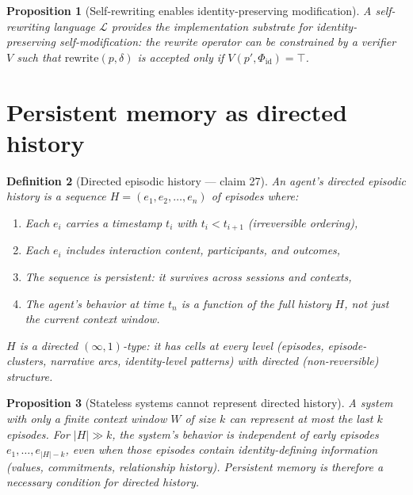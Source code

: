 \documentclass[11pt,a4paper]{article}
\newtheorem{definition}{Definition}[section]
\newtheorem{proposition}[definition]{Proposition}
\begin{document}
\begin{proposition}[Self-rewriting enables identity-preserving modification]
\label{prop:sr-ipm}
A self-rewriting language $\mathcal{L}$ provides the implementation
substrate for identity-preserving self-modification: the rewrite
operator can be constrained by a verifier $V$ such that
$\text{rewrite}(p, \delta)$ is accepted only if
$V(p', \Phi_{\text{id}}) = \top$.
\end{proposition}

\section{Persistent memory as directed history}
\label{sec:memory}

\begin{definition}[Directed episodic history --- claim 27]
\label{def:directed-history}
An agent's \emph{directed episodic history} is a sequence
$H = (e_1, e_2, \ldots, e_n)$ of episodes where:
\begin{enumerate}
\item Each $e_i$ carries a timestamp $t_i$ with $t_i < t_{i+1}$ (irreversible ordering),
\item Each $e_i$ includes interaction content, participants, and outcomes,
\item The sequence is persistent: it survives across sessions and contexts,
\item The agent's behavior at time $t_n$ is a function of the full
  history $H$, not just the current context window.
\end{enumerate}
$H$ is a directed $(\infty,1)$-type: it has cells at every level
(episodes, episode-clusters, narrative arcs, identity-level patterns)
with directed (non-reversible) structure.
\end{definition}

\begin{proposition}[Stateless systems cannot represent directed history]
\label{prop:stateless}
A system with only a finite context window $W$ of size $k$ can represent
at most the last $k$ episodes. For $|H| \gg k$, the system's behavior
is independent of early episodes $e_1, \ldots, e_{|H|-k}$, even when
those episodes contain identity-defining information (values, commitments,
relationship history). Persistent memory is therefore a necessary
condition for directed history.
\end{proposition}
\end{document}
